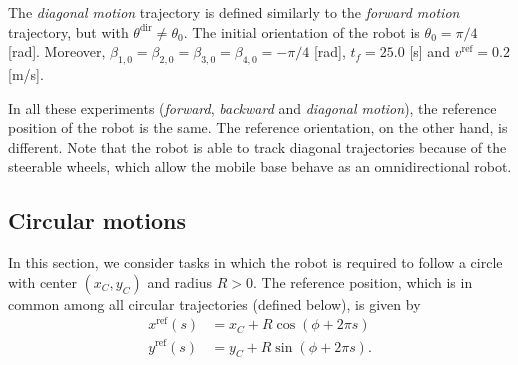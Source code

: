 The \textit{diagonal motion} trajectory is defined similarly to the \textit{forward motion} trajectory, but with $\theta^{\mathrm{dir}} \ne \theta_0$. The initial orientation of the robot is $\theta_0=\pi/4$ [rad]. Moreover, $\beta_{1,0}=\beta_{2,0}=\beta_{3,0}=\beta_{4,0}=-\pi/4$ [rad], $t_f = 25.0$ [s] and $v^{\mathrm{ref}}=0.2$ [m/s]. %

In all these experiments (\textit{forward}, \textit{backward} and \textit{diagonal motion}), the reference position of the robot is the same. The reference orientation, on the other hand, is different. Note that the robot is able to track diagonal trajectories because of the steerable wheels, which allow the mobile base behave as an omnidirectional robot.

\subsection{Circular motions}
In this section, we consider tasks in which the robot is required to follow a circle with center $(x_C, y_C)$ and radius $R > 0$. The reference position, which is in common among all circular trajectories (defined below), is given by
\begin{subequations}
    \begin{align*}
        x^{\mathrm{ref}}(s) &= x_C + R \cos(\phi + 2 \pi s) \\
        y^{\mathrm{ref}}(s) &= y_C + R \sin(\phi + 2 \pi s).
    \end{align*} 
\end{subequations}

